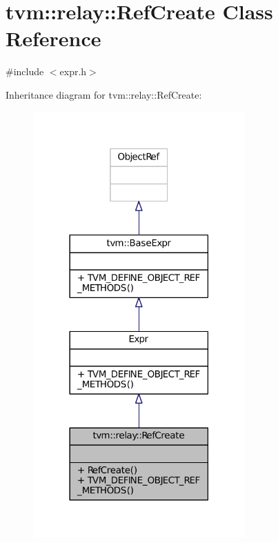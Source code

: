 \hypertarget{classtvm_1_1relay_1_1RefCreate}{}\section{tvm\+:\+:relay\+:\+:Ref\+Create Class Reference}
\label{classtvm_1_1relay_1_1RefCreate}


{\ttfamily \#include $<$expr.\+h$>$}



Inheritance diagram for tvm\+:\+:relay\+:\+:Ref\+Create\+:
\nopagebreak
\begin{figure}[H]
\begin{center}
\leavevmode
\includegraphics[width=230pt]{classtvm_1_1relay_1_1RefCreate__inherit__graph}
\end{center}
\end{figure}


